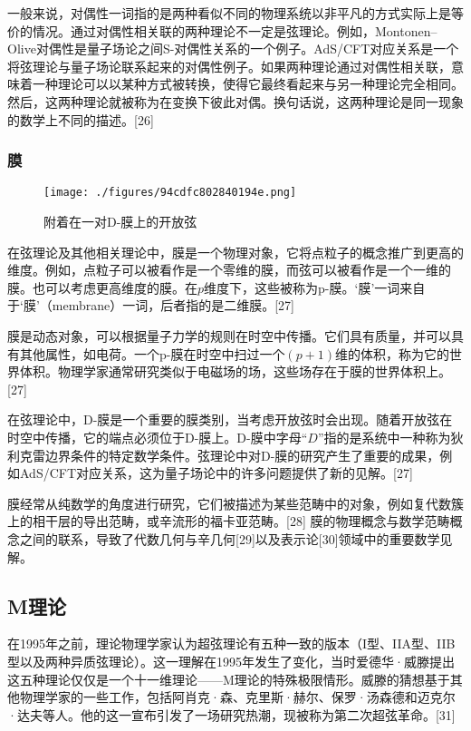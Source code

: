 一般来说，对偶性一词指的是两种看似不同的物理系统以非平凡的方式实际上是等价的情况。通过对偶性相关联的两种理论不一定是弦理论。例如，Montonen–Olive对偶性是量子场论之间S-对偶性关系的一个例子。AdS/CFT对应关系是一个将弦理论与量子场论联系起来的对偶性例子。如果两种理论通过对偶性相关联，意味着一种理论可以以某种方式被转换，使得它最终看起来与另一种理论完全相同。然后，这两种理论就被称为在变换下彼此对偶。换句话说，这两种理论是同一现象的数学上不同的描述。[26]
\subsubsection{膜}
\begin{figure}[ht]
\centering
\texttt{[image: ./figures/94cdfc802840194e.png]}
\caption{附着在一对D-膜上的开放弦} \label{fig_String_6}
\end{figure}
在弦理论及其他相关理论中，膜是一个物理对象，它将点粒子的概念推广到更高的维度。例如，点粒子可以被看作是一个零维的膜，而弦可以被看作是一个一维的膜。也可以考虑更高维度的膜。在\(p\)维度下，这些被称为p-膜。‘膜’一词来自于‘膜’（membrane）一词，后者指的是二维膜。[27]

膜是动态对象，可以根据量子力学的规则在时空中传播。它们具有质量，并可以具有其他属性，如电荷。一个p-膜在时空中扫过一个\((p+1)\)维的体积，称为它的世界体积。物理学家通常研究类似于电磁场的场，这些场存在于膜的世界体积上。[27]

在弦理论中，D-膜是一个重要的膜类别，当考虑开放弦时会出现。随着开放弦在时空中传播，它的端点必须位于D-膜上。D-膜中字母“\(D\)”指的是系统中一种称为狄利克雷边界条件的特定数学条件。弦理论中对D-膜的研究产生了重要的成果，例如AdS/CFT对应关系，这为量子场论中的许多问题提供了新的见解。[27]

膜经常从纯数学的角度进行研究，它们被描述为某些范畴中的对象，例如复代数簇上的相干层的导出范畴，或辛流形的福卡亚范畴。[28] 膜的物理概念与数学范畴概念之间的联系，导致了代数几何与辛几何[29]以及表示论[30]领域中的重要数学见解。
\subsection{M理论}  
在1995年之前，理论物理学家认为超弦理论有五种一致的版本（I型、IIA型、IIB型以及两种异质弦理论）。这一理解在1995年发生了变化，当时爱德华·威滕提出这五种理论仅仅是一个十一维理论——M理论的特殊极限情形。威滕的猜想基于其他物理学家的一些工作，包括阿肖克·森、克里斯·赫尔、保罗·汤森德和迈克尔·达夫等人。他的这一宣布引发了一场研究热潮，现被称为第二次超弦革命。[31]
